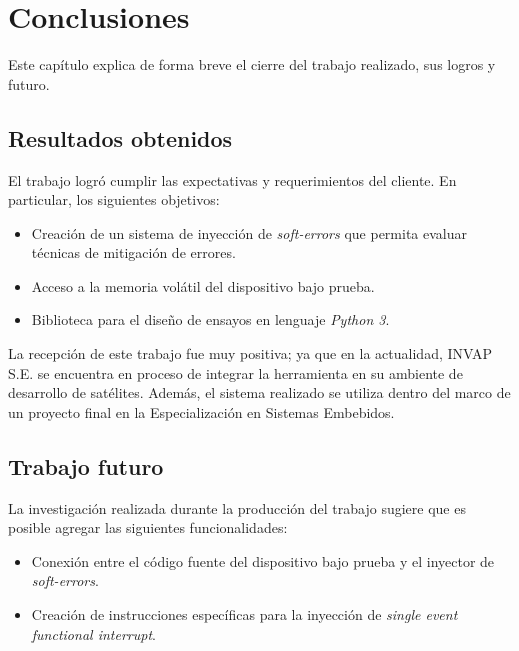 \chapter{Conclusiones}
\label{Chapter5}

Este capítulo explica de forma breve el cierre del trabajo realizado, sus logros y futuro.

\section{Resultados obtenidos}
\label{sec:5resultados}

El trabajo logró cumplir las expectativas y requerimientos del cliente.
En particular, los siguientes objetivos:

\begin{itemize}
    \item Creación de un sistema de inyección de \emph{soft-errors} que permita evaluar técnicas de mitigación de errores.
    \item Acceso a la memoria volátil del dispositivo bajo prueba.
    \item Biblioteca para el diseño de ensayos en lenguaje \emph{Python 3}.
\end{itemize}

La recepción de este trabajo fue muy positiva; ya que en la actualidad, INVAP S.E. se encuentra en proceso de integrar la herramienta en su ambiente de desarrollo de satélites.
Además, el sistema realizado se utiliza dentro del marco de un proyecto final en la Especialización en Sistemas Embebidos.

\section{Trabajo futuro}
\label{sec:5futuro}

La investigación realizada durante la producción del trabajo sugiere que es posible agregar las siguientes funcionalidades:

\begin{itemize}
    \item Conexión entre el código fuente del dispositivo bajo prueba y el inyector de \emph{soft-errors}.
    \item Creación de instrucciones específicas para la inyección de \emph{single event functional interrupt}.
\end{itemize}
